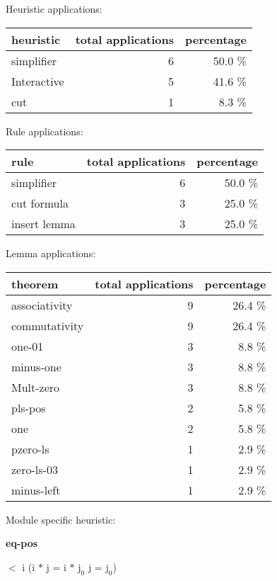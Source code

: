 \documentclass[a4paper]{article}
\begin{document}
\medskip


Heuristic applications:

\begin{supertabular}{l|r|r}
heuristic	& total applications & percentage \\ \hline
simplifier & 6 & 50.0 \% \\
Interactive & 5 & 41.6 \% \\
cut & 1 & 8.3 \% \\

\end{supertabular}

Rule applications:

\begin{supertabular}{l|r|r}
rule	        & total applications & percentage \\ \hline
simplifier & 6 & 50.0 \% \\
cut formula & 3 & 25.0 \% \\
insert lemma & 3 & 25.0 \% \\

\end{supertabular}

Lemma applications:

\begin{supertabular}{l|r|r}
theorem	        & total applications & percentage \\ \hline
associativity & 9 & 26.4 \% \\
commutativity & 9 & 26.4 \% \\
one-01 & 3 & 8.8 \% \\
minus-one & 3 & 8.8 \% \\
Mult-zero & 3 & 8.8 \% \\
pls-pos & 2 & 5.8 \% \\
one & 2 & 5.8 \% \\
pzero-ls & 1 & 2.9 \% \\
zero-ls-03 & 1 & 2.9 \% \\
minus-left & 1 & 2.9 \% \\

\end{supertabular}

Module specific heuristic:

\pagebreak

{\LARGE\bf eq-pos}\label{lemma-eq-pos}

\medskip

  $<$ i \Imp (i $*$ j = i $*$ $\mbox{j}_{0}$ \Equiv j = $\mbox{j}_{0}$)
\end{document}
